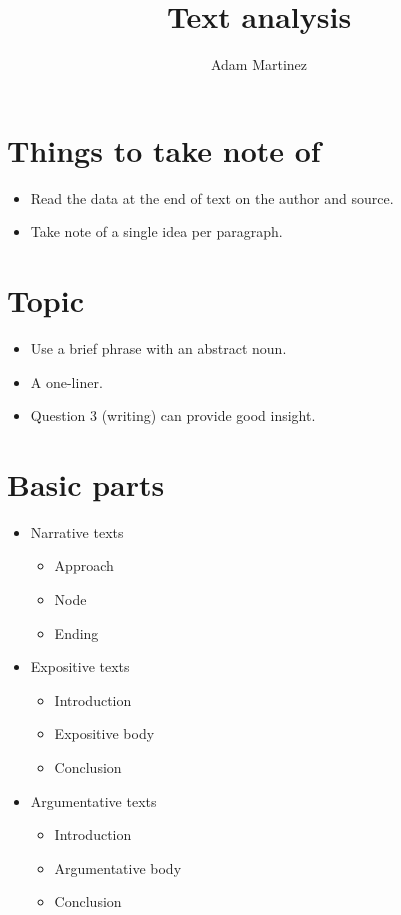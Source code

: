 \documentclass{article}
\title{Text analysis}
\author{Adam Martinez}
\date{}
\begin{document}
\maketitle

\section*{Things to take note of}

\begin{itemize}
    \item Read the data at the end of text on the author and source.
    \item Take note of a single idea per paragraph.
\end{itemize}

\section*{Topic}

\begin{itemize}
    \item Use a brief phrase with an abstract noun.
    \item A one-liner.
    \item Question 3 (writing) can provide good insight.
\end{itemize}

\section*{Basic parts}

\begin{itemize}
    \item Narrative texts
    \begin{itemize}
        \item Approach
        \item Node
        \item Ending
    \end{itemize}
    \item Expositive texts
    \begin{itemize}
        \item Introduction
        \item Expositive body
        \item Conclusion
    \end{itemize}
    \item Argumentative texts
    \begin{itemize}
        \item Introduction
        \item Argumentative body
        \item Conclusion
    \end{itemize}
\end{itemize}
\end{document}
